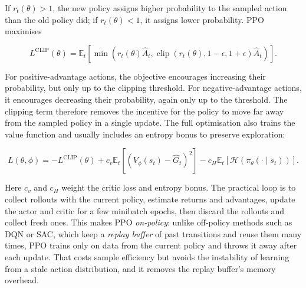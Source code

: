 If $r_t(\theta) > 1$, the new policy assigns higher probability to the sampled
action than the old policy did; if $r_t(\theta) < 1$, it assigns lower
probability. PPO maximises

\begin{equation}
L^{\mathrm{CLIP}}(\theta)
=
\mathbb{E}_t
\left[
\min
\left(
    r_t(\theta)\hat{A}_t,
    \operatorname{clip}
    \left(r_t(\theta), 1-\epsilon, 1+\epsilon\right)
    \hat{A}_t
\right)
\right].
\end{equation}

For positive-advantage actions, the objective encourages increasing their
probability, but only up to the clipping threshold. For negative-advantage
actions, it encourages decreasing their probability, again only up to the
threshold. The clipping term therefore removes the incentive for the policy to
move far away from the sampled policy in a single update. The full optimisation
also trains the value function and usually includes an entropy bonus to
preserve exploration:

\begin{equation}
L(\theta,\phi)
=
-L^{\mathrm{CLIP}}(\theta)
+ c_v \mathbb{E}_t
  \left[
      \left(V_\phi(s_t)-\hat{G}_t\right)^2
  \right]
- c_H \mathbb{E}_t
  \left[
      \mathcal{H}(\pi_\theta(\cdot\mid s_t))
  \right].
\end{equation}

Here $c_v$ and $c_H$ weight the critic loss and entropy bonus. The practical
loop is to collect rollouts with the current policy, estimate returns and
advantages, update the actor and critic for a few minibatch epochs, then
discard the rollouts and collect fresh ones. This makes PPO \emph{on-policy}:
unlike off-policy methods such as DQN or SAC, which keep a \emph{replay buffer}
of past transitions and reuse them many times, PPO trains only on data from the
current policy and throws it away after each update. That costs sample
efficiency but avoids the instability of learning from a stale action
distribution, and it removes the replay buffer's memory overhead.
